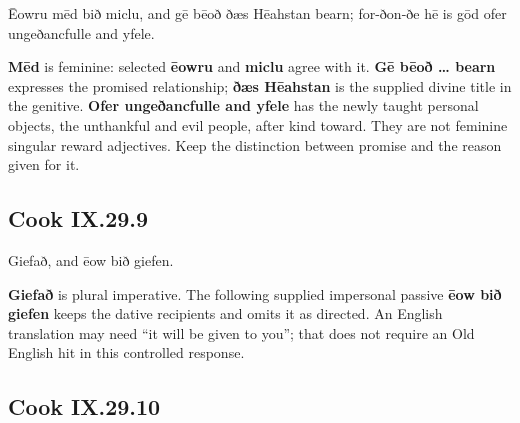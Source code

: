 \par\begin{minipage}{\linewidth}\raggedright
Ēowru mēd bið miclu, and gē bēoð ðæs Hēahstan bearn; for-ðon-ðe hē is gōd ofer ungeðancfulle and yfele.

\textbf{Mēd} is feminine: selected \textbf{ēowru} and \textbf{miclu} agree with it. \textbf{Gē bēoð … bearn} expresses the promised relationship; \textbf{ðæs Hēahstan} is the supplied divine title in the genitive. \textbf{Ofer ungeðancfulle and yfele} has the newly taught personal objects, the unthankful and evil people, after kind toward. They are not feminine singular reward adjectives. Keep the distinction between promise and the reason given for it.

\end{minipage}\par\addvspace{4pt}

\subsection*{Cook IX.29.9}

\par\begin{minipage}{\linewidth}\raggedright
Giefað, and ēow bið giefen.

\textbf{Giefað} is plural imperative. The following supplied impersonal passive \textbf{ēow bið giefen} keeps the dative recipients and omits it as directed. An English translation may need “it will be given to you”; that does not require an Old English hit in this controlled response.

\end{minipage}\par\addvspace{4pt}

\subsection*{Cook IX.29.10}

